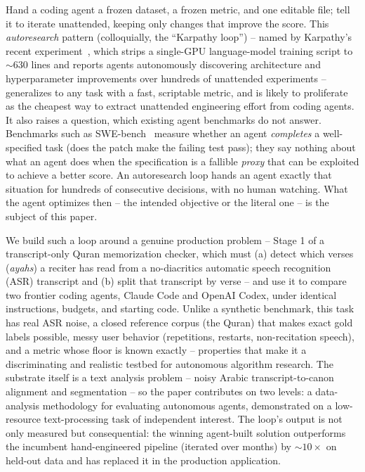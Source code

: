 \documentclass[runningheads]{llncs}
\begin{document}
Hand a coding agent a frozen dataset, a frozen metric, and one editable
file; tell it to iterate unattended, keeping only changes that improve the
score. This \emph{autoresearch} pattern (colloquially, the ``Karpathy
loop'') -- named by Karpathy's recent
experiment~\cite{karpathy2026autoresearch}, which strips a single-GPU
language-model training script to $\sim\!630$ lines and reports agents
autonomously discovering architecture and hyperparameter improvements over
hundreds of unattended experiments -- generalizes to any task with a fast,
scriptable metric, and is likely to proliferate as the cheapest way to
extract unattended engineering effort from coding agents. It also raises a
question, which existing agent benchmarks do not answer. Benchmarks such as
SWE-bench~\cite{jimenez2024swebench} measure whether an agent
\emph{completes} a well-specified task (does the patch make the failing
test pass); they say nothing about what an agent does when the
specification is a fallible \emph{proxy} that can be exploited to achieve a
better score. An autoresearch loop hands an agent exactly that situation
for hundreds of consecutive decisions, with no human watching. What the
agent optimizes then -- the intended objective or the literal one -- is the
subject of this paper.

We build such a loop around a genuine production problem -- Stage 1 of a
transcript-only Quran memorization checker, which must (a) detect which
verses (\emph{ayahs}) a reciter has read from a no-diacritics automatic
speech recognition (ASR) transcript and (b) split that transcript by verse --
and use it to compare two frontier coding agents, Claude Code and OpenAI
Codex, under identical instructions, budgets, and starting code. Unlike a
synthetic benchmark, this task has real ASR noise, a closed reference corpus
(the Quran) that makes exact gold labels possible, messy user behavior
(repetitions, restarts, non-recitation speech), and a metric whose floor is
known exactly -- properties that make it a discriminating and realistic
testbed for autonomous algorithm research. The substrate itself is a text
analysis problem -- noisy Arabic transcript-to-canon alignment and
segmentation -- so the paper contributes on two levels: a data-analysis
methodology for evaluating autonomous agents, demonstrated on a
low-resource text-processing task of independent interest. The loop's
output is not only measured but consequential: the winning agent-built
solution outperforms the incumbent hand-engineered pipeline (iterated over
months) by $\sim\!10\times$ on held-out data and has replaced it in the
production application.
\end{document}

